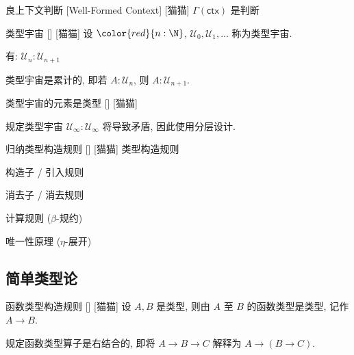 \documentclass[UTF8]{ctexart}
\begin{document}
        \begin{dfn}
            []
            {良上下文判断}
            [Well-Formed Context]
            [猫猫]
            \(\Gamma(\mathsf{ctx})\) 是判断
        \end{dfn}
        
        \begin{axm}
            []
            {类型宇宙}
            []
            [猫猫]
            设 \(\color{red}{n:\N}\), \(\mathcal{U}_0, \mathcal{U}_1, \dots\) 称为类型宇宙. 

            有: \(\mathcal{U}_n:\mathcal{U}_{n+1}\)

            类型宇宙是累计的, 即若 \(A:\mathcal{U}_n\), 则 \(A:\mathcal{U}_{n+1}\). 
        \end{axm}
        
        \begin{ppt}
            []
            {类型宇宙的元素是类型}
            []
            [猫猫]
        \end{ppt}
        
        \begin{rmk}
            规定类型宇宙 \(\mathcal{U}_{\infty}:\mathcal{U}_{\infty}\) 将导致矛盾, 因此使用分层设计. 
        \end{rmk}
        
        \begin{axm}
            []
            {归纳类型构造规则}
            []
            [猫猫]
            类型构造规则

            构造子 / 引入规则

            消去子 / 消去规则

            计算规则 ($\beta$-规约)

            唯一性原理 ($\eta$-展开)
        \end{axm}

    \subsection{简单类型论}
        
        \begin{axm}
            []
            {函数类型构造规则}
            []
            [猫猫]
            设 \(A, B\) 是类型, 则由 \(A\) 至 \(B\) 的函数类型是类型, 记作 \(A \to B\). 
        \end{axm}
        
        \begin{rmk}
            [猫猫]
            规定函数类型算子是右结合的, 即将 \(A \to B \to C\) 解释为 \(A \to (B \to C)\). 
        \end{rmk}
        
\end{document}
